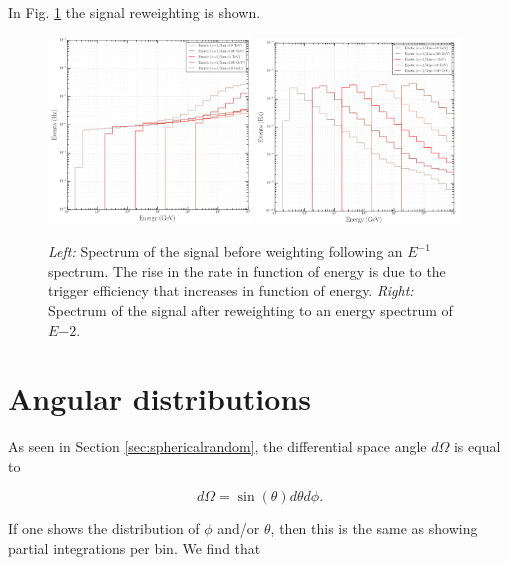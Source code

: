 \begin{appendices}
In Fig. \ref{fig:signalweighting} the signal reweighting is shown.

\begin{figure}
\centering
\includegraphics[width=0.48\textwidth]{appendix/img/SpectrumBeforeWeighting.png}
\includegraphics[width=0.48\textwidth]{appendix/img/SpectrumAfterWeighting.png}
\caption{\textit{Left: }Spectrum of the signal before weighting following an $E^{-1}$ spectrum. The rise in the rate in function of energy is due to the trigger efficiency that increases in function of energy. \textit{Right: }Spectrum of the signal after reweighting to an energy spectrum of $E{-2}$.}
\label{fig:signalweighting}
\end{figure}

\section{Angular distributions}
\label{sec:angularappendix}
As seen in Section \ref{sec:sphericalrandom}, the differential space angle $d\Omega$ is equal to

\begin{equation}
d\Omega = \sin(\theta) d\theta d\phi.
\end{equation} 

\noindent If one shows the distribution of $\phi$ and/or $\theta$, then this is the same as showing partial integrations per bin. We find that


\end{appendices}
